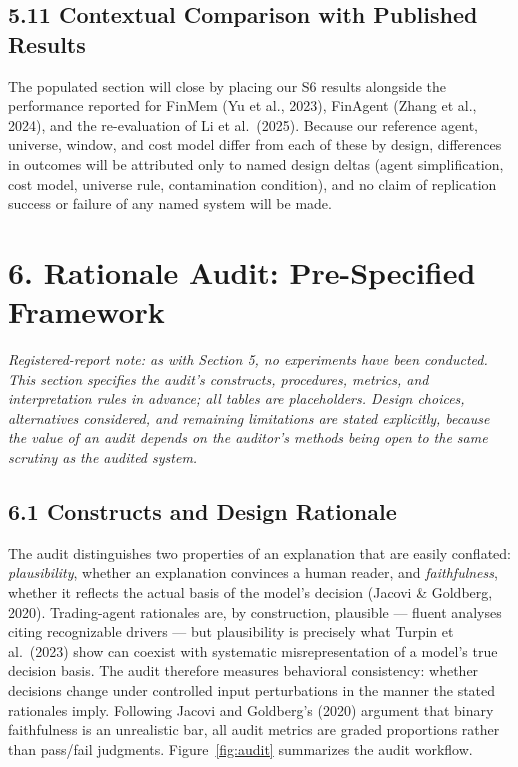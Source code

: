 \documentclass[
  12pt,
]{article}
\begin{document}
\hypertarget{contextual-comparison-with-published-results}{%
\subsection{5.11 Contextual Comparison with Published
Results}\label{contextual-comparison-with-published-results}}

The populated section will close by placing our S6 results alongside the
performance reported for FinMem (Yu et al., 2023), FinAgent (Zhang et
al., 2024), and the re-evaluation of Li et al.~(2025). Because our
reference agent, universe, window, and cost model differ from each of
these by design, differences in outcomes will be attributed only to
named design deltas (agent simplification, cost model, universe rule,
contamination condition), and no claim of replication success or failure
of any named system will be made.

\hypertarget{rationale-audit-pre-specified-framework}{%
\section{6. Rationale Audit: Pre-Specified
Framework}\label{rationale-audit-pre-specified-framework}}

\emph{Registered-report note: as with Section 5, no experiments have
been conducted. This section specifies the audit's constructs,
procedures, metrics, and interpretation rules in advance; all tables are
placeholders. Design choices, alternatives considered, and remaining
limitations are stated explicitly, because the value of an audit depends
on the auditor's methods being open to the same scrutiny as the audited
system.}

\hypertarget{constructs-and-design-rationale}{%
\subsection{6.1 Constructs and Design
Rationale}\label{constructs-and-design-rationale}}

The audit distinguishes two properties of an explanation that are easily
conflated: \emph{plausibility}, whether an explanation convinces a human
reader, and \emph{faithfulness}, whether it reflects the actual basis of
the model's decision (Jacovi \& Goldberg, 2020). Trading-agent
rationales are, by construction, plausible --- fluent analyses citing
recognizable drivers --- but plausibility is precisely what Turpin et
al.~(2023) show can coexist with systematic misrepresentation of a
model's true decision basis. The audit therefore measures behavioral
consistency: whether decisions change under controlled input
perturbations in the manner the stated rationales imply. Following
Jacovi and Goldberg's (2020) argument that binary faithfulness is an
unrealistic bar, all audit metrics are graded proportions rather than
pass/fail judgments. Figure~\ref{fig:audit} summarizes the audit workflow.
\end{document}
